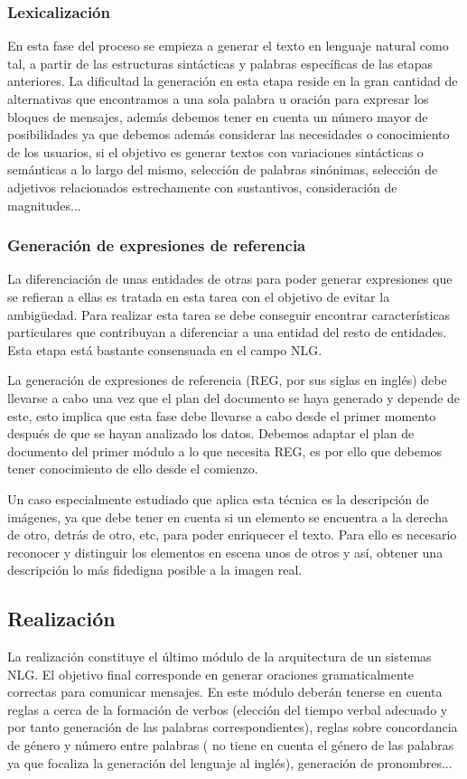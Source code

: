 \subsubsection{Lexicalización}
En esta fase del proceso se empieza a generar el texto en lenguaje natural como tal, a partir de las estructuras sintácticas y palabras específicas de las etapas anteriores. La dificultad  la generación en esta etapa reside en la gran cantidad de alternativas que encontramos a una sola palabra u oración para expresar los bloques de mensajes, además debemos tener en cuenta un número mayor de posibilidades ya que debemos además considerar las necesidades o conocimiento de los usuarios, si el objetivo es generar textos con variaciones sintácticas o semánticas a lo largo del mismo, selección de palabras sinónimas, selección de adjetivos relacionados estrechamente con sustantivos, consideración de magnitudes... 


\subsubsection{Generación de expresiones de referencia}
La diferenciación de unas entidades de otras para poder generar expresiones que se refieran a ellas es tratada en esta tarea con el objetivo de evitar la ambigüedad. Para realizar esta tarea se debe conseguir encontrar características particulares que contribuyan a diferenciar a una entidad del resto de entidades. Esta etapa está bastante consensuada en el campo NLG. 

La generación de expresiones de referencia (REG, por sus siglas en inglés) debe llevarse a cabo una vez que el plan del documento se haya generado y depende de este, esto implica que esta fase debe llevarse a cabo desde el primer momento después de que se hayan analizado los datos. Debemos adaptar el plan de documento del primer módulo a lo que necesita REG, es por ello que debemos tener conocimiento de ello desde el comienzo.

Un caso especialmente estudiado que aplica esta técnica es la descripción de imágenes, ya que debe tener en cuenta si un elemento se encuentra a la derecha de otro, detrás de otro, etc, para poder enriquecer el texto. Para ello es necesario reconocer y distinguir los elementos en escena unos de otros y así, obtener una descripción lo más fidedigna posible a la imagen real.

\subsection{Realización}
La realización constituye el último módulo de la arquitectura de un sistemas NLG. El objetivo final corresponde en generar oraciones gramaticalmente correctas para comunicar mensajes. En este módulo deberán tenerse en cuenta reglas a cerca de la formación de verbos (elección del tiempo verbal adecuado y por tanto generación de las palabras correspondientes), reglas sobre concordancia de género y número entre palabras (\cite{reiter1997building} no tiene en cuenta el género de las palabras ya que focaliza la generación del lenguaje al inglés), generación de pronombres...
 
